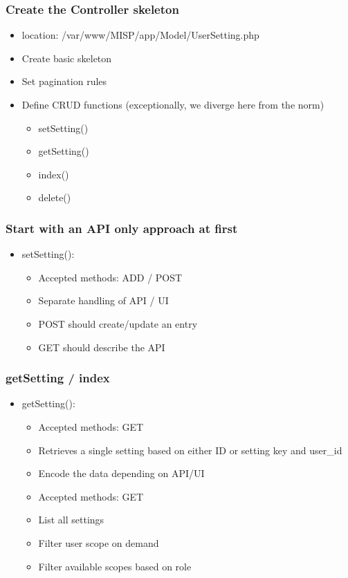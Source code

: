 \begin{frame}
\frametitle{Create the Controller skeleton}
  \begin{itemize}
    \item location: /var/www/MISP/app/Model/UserSetting.php
    \item Create basic skeleton
    \item Set pagination rules
    \item Define CRUD functions (exceptionally, we diverge here from the norm)
    \begin{itemize}
      \item setSetting()
      \item getSetting()
      \item index()
      \item delete()
    \end{itemize}
  \end{itemize}
\end{frame}


\begin{frame}
\frametitle{Start with an API only approach at first}
  \begin{itemize}
    \item setSetting():
    \begin{itemize}
      \item Accepted methods: ADD / POST
      \item Separate handling of API / UI
      \item POST should create/update an entry
      \item GET should describe the API
    \end{itemize}
  \end{itemize}
\end{frame}

\begin{frame}
\frametitle{getSetting / index}
  \begin{itemize}
    \item getSetting():
    \begin{itemize}
      \item Accepted methods: GET
      \item Retrieves a single setting based on either ID or setting key and user\_id
      \item Encode the data depending on API/UI
    \end{itemize}
    \begin{itemize}
      \item Accepted methods: GET
      \item List all settings
      \item Filter user scope on demand
      \item Filter available scopes based on role
    \end{itemize}
  \end{itemize}
\end{frame}

